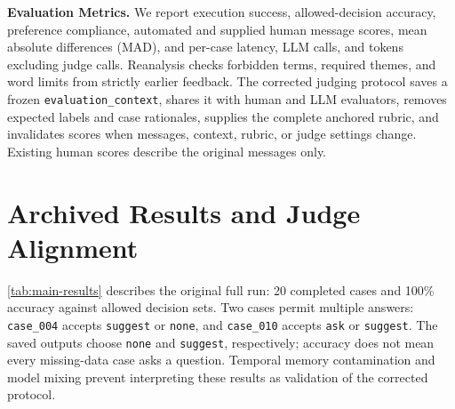 \documentclass{article}
\begin{document}
\textbf{Evaluation Metrics.} We report execution success, allowed-decision accuracy, preference compliance, automated and supplied human message scores, mean absolute differences (MAD), and per-case latency, LLM calls, and tokens excluding judge calls. Reanalysis checks forbidden terms, required themes, and word limits from strictly earlier feedback. The corrected judging protocol saves a frozen \texttt{evaluation\_context}, shares it with human and LLM evaluators, removes expected labels and case rationales, supplies the complete anchored rubric, and invalidates scores when messages, context, rubric, or judge settings change. Existing human scores describe the original messages only.

\section{Archived Results and Judge Alignment}
\label{sec:results}

\begin{table}[t]
  \caption{Archived performance of the original full multi-agent system (\texttt{full}: planning depth $K_p=2$, reflection depth $K_r=2$) across the five evaluation categories ($N=20$ cases). LLM Judge scores are rated 1--5 on non-null messages (\texttt{suggest} and \texttt{ask}). Efficiency metrics include all model and tool steps per case, excluding judge evaluation.}
  \label{tab:main-results}
  \vskip 0.1in
  \begin{center}
    \begin{small}
      
    \end{small}
  \end{center}
  \vskip -0.1in
\end{table}

\cref{tab:main-results} describes the original full run: 20 completed cases and 100\% accuracy against allowed decision sets. Two cases permit multiple answers: \texttt{case\_004} accepts \texttt{suggest} or \texttt{none}, and \texttt{case\_010} accepts \texttt{ask} or \texttt{suggest}. The saved outputs choose \texttt{none} and \texttt{suggest}, respectively; accuracy does not mean every missing-data case asks a question. Temporal memory contamination and model mixing prevent interpreting these results as validation of the corrected protocol.

\begin{table}[t]
  \caption{Comparison between supplied Human Judge ratings and LLM Judge scores across $N=15$ non-null messages from the \texttt{full} configuration, reporting mean $\pm$ SD, Mean Absolute Difference (MAD), signed difference $\Delta (L - H)$, and agreement within $\pm 1$ point.}
  \label{tab:human-vs-llm}
  \vskip 0.1in
  \begin{center}
    \begin{footnotesize}
      \resizebox{0.95\textwidth}{!}{}
    \end{footnotesize}
  \end{center}
  \vskip -0.1in
\end{table}
\end{document}
